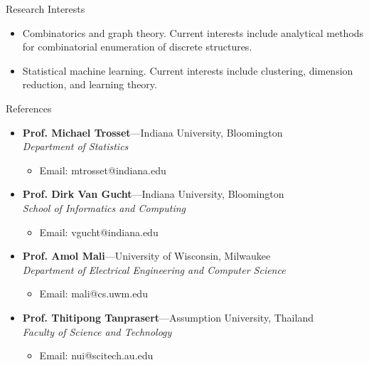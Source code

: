 \documentclass[12pt,reqno,final,ugsabstract,ugsabstractsigs]{iuthesis}
\theoremstyle{definition}
\numberwithin{equation}{chapter}
\numberwithin{section}{chapter}
\newenvironment{ressection}[1]{
	\vspace{4pt}
	{\fontfamily{phv}\selectfont\Large#1}
	\begin{itemize}
	\vspace{3pt}
}{
	\end{itemize}
}
\newcommand{\resitem}[1]{
	\vspace{-4pt}
	\item \begin{flushleft} #1 \end{flushleft}
}
\newcommand{\ressubitem}[1]{
	\vspace{-1pt}
	\item \begin{flushleft} #1 \end{flushleft}
}
\newcommand{\resbigitem}[3]{
	\vspace{-5pt}
	\item
	\textbf{#1}---#2 \\
	\textit{#3}
}
\newenvironment{ressubsec}[3]{
	\resbigitem{#1}{#2}{#3}
	\vspace{-2pt}
	\begin{itemize}
}{
	\end{itemize}
}
\begin{document}
\begin{ressection}{Research Interests}

	\resitem{Combinatorics and graph theory. Current interests include
    analytical methods for combinatorial enumeration of discrete
    structures.}

	\resitem{Statistical machine learning. Current interests include
      clustering, dimension reduction, and learning theory.}

\end{ressection}
\begin{ressection}{References}

	\begin{ressubsec}{Prof. Michael Trosset}{Indiana University,
        Bloomington}{Department of Statistics}
		\ressubitem{Email: mtrosset@indiana.edu}
	\end{ressubsec}
	\begin{ressubsec}{Prof. Dirk Van Gucht}{Indiana University,
        Bloomington}{School of Informatics and Computing} 
		\ressubitem{Email: vgucht@indiana.edu}
	\end{ressubsec}
	\begin{ressubsec}{Prof. Amol Mali}{University of Wisconsin,
        Milwaukee}{Department of Electrical Engineering and Computer
          Science}
		\ressubitem{Email: mali@cs.uwm.edu}
	\end{ressubsec}
	\begin{ressubsec}{Prof. Thitipong Tanprasert}{Assumption University, Thailand}{Faculty of Science and Technology}
		\ressubitem{Email: nui@scitech.au.edu}
	\end{ressubsec}
\end{ressection}


\vfill\newpage
\end{document}
